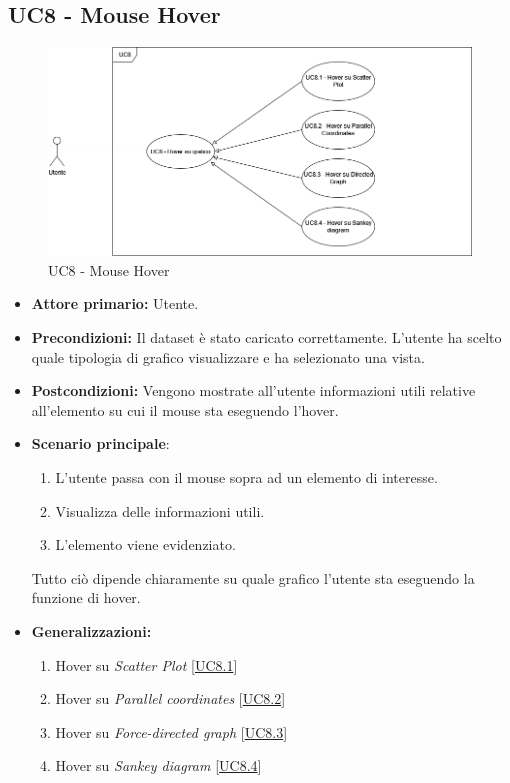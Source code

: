 \subsection{UC8 - Mouse Hover}
\label{sec:UC8}
\begin{figure}[h!]
    \centering
    \includegraphics[scale=0.45]{../../assets/UC8-MouseHover.png}
    \caption{UC8 - Mouse Hover}
\end{figure}
\begin{itemize}
    \item \textbf{Attore primario:} Utente.
    \item \textbf{Precondizioni:} Il dataset è stato caricato correttamente. L'utente ha scelto quale tipologia di grafico visualizzare e ha selezionato una vista.
    \item \textbf{Postcondizioni:} Vengono mostrate all'utente informazioni utili relative all'elemento su cui il mouse sta eseguendo l'hover.
    \item \textbf{Scenario principale}: 
    \begin{enumerate}
		\item L'utente passa con il mouse sopra ad un elemento di interesse. 
		\item Visualizza delle informazioni utili.
		\item L'elemento viene evidenziato. 
	\end{enumerate}
	Tutto ciò dipende chiaramente su quale grafico l'utente sta eseguendo la funzione di hover.
    \item \textbf{Generalizzazioni:} \begin{enumerate}
                                        \item Hover su \textit{Scatter Plot} [\hyperref[sec:UC8.1]{UC8.1}]
                                        \item Hover su \textit{Parallel coordinates} [\hyperref[sec:UC8.2]{UC8.2}]
                                        \item Hover su \textit{Force-directed graph} [\hyperref[sec:UC8.3]{UC8.3}]
                                        \item Hover su \textit{Sankey diagram} [\hyperref[sec:UC8.4]{UC8.4}]
                                    \end{enumerate}
\end{itemize}

